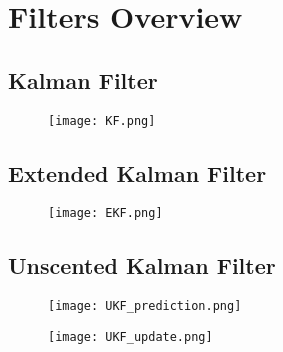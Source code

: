 
\chapter{Filters Overview}

\section{Kalman Filter}
\begin{figure}[H]
  \centering
  \texttt{[image: KF.png]}
\end{figure}

\section{Extended Kalman Filter}
\begin{figure}[H]
  \centering
  \texttt{[image: EKF.png]}
\end{figure}

\section{Unscented Kalman Filter}
\begin{figure}[H]
  \centering
  \texttt{[image: UKF\_prediction.png]}
\end{figure}

\begin{figure}[H]
  \centering
  \texttt{[image: UKF\_update.png]}
\end{figure}
